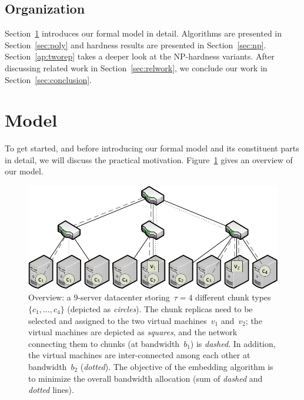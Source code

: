 \documentclass[preprint,12pt]{elsarticle}
\newcommand{\CostTrans}{\ensuremath{b_1}}
\newcommand{\CostCom}{\ensuremath{b_2}}
\begin{document}
\subsection{Organization}

Section~\ref{sec:model} introduces our formal model in detail.
Algorithms are presented in Section~\ref{sec:poly} and
hardness results are presented in Section~\ref{sec:np}.
Section~\ref{ap:tworep} takes a deeper look
at the NP-hardness variants.
After discussing related work in Section~\ref{sec:relwork},
we conclude our work in Section~\ref{sec:conclusion}.

\section{Model}\label{sec:model}

To get started, and before introducing our formal model and its constituent parts in detail,
we will discuss the practical motivation.
Figure~\ref{fig:overview} gives an overview of our model.

\begin{figure}[t]
\centering
\includegraphics[width=0.79\columnwidth]{figs/data_locality_no_legend.pdf}
\caption{Overview: a 9-server datacenter storing~$\tau=4$ different chunk
types~$\{c_1,\ldots,c_4\}$ (depicted as \emph{circles}). The chunk replicas need to be selected and assigned to the two
 virtual machines~$v_1$ and~$v_2$; the virtual machines are depicted as \emph{squares}, and
 the network connecting them to chunks (at bandwidth~$\CostTrans$) is \emph{dashed}. In addition, the virtual machines are inter-connected among
 each other at bandwidth~$\CostCom$ (\emph{dotted}). The objective of the embedding algorithm is to minimize the overall bandwidth allocation
 (sum of \emph{dashed} and \emph{dotted} lines).}\label{fig:overview}
\vspace{-1em}
\end{figure}
\end{document}
